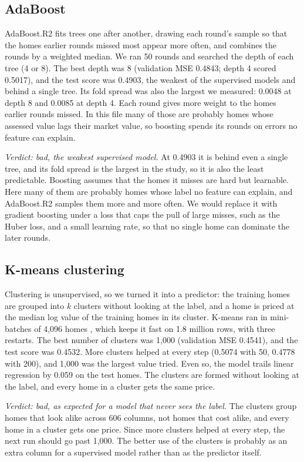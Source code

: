 \documentclass[sigconf,nonacm,10pt]{acmart}
\begin{document}
\subsection{AdaBoost}
AdaBoost.R2 \cite{freund1997,drucker1997} fits trees one after another, drawing each round's sample so that the homes earlier rounds missed most appear more often, and combines the rounds by a weighted median. We ran 50 rounds and searched the depth of each tree (4 or 8). The best depth was 8 (validation MSE 0.4843; depth 4 scored 0.5017), and the test score was 0.4903, the weakest of the supervised models and behind a single tree. Its fold spread was also the largest we measured: 0.0048 at depth 8 and 0.0085 at depth 4. Each round gives more weight to the homes earlier rounds missed. In this file many of those are probably homes whose assessed value lags their market value, so boosting spends its rounds on errors no feature can explain.

\emph{Verdict: bad, the weakest supervised model.} At 0.4903 it is behind even a single tree, and its fold spread is the largest in the study, so it is also the least predictable. Boosting assumes that the homes it misses are hard but learnable. Here many of them are probably homes whose label no feature can explain, and AdaBoost.R2 samples them more and more often. We would replace it with gradient boosting under a loss that caps the pull of large misses, such as the Huber loss, and a small learning rate, so that no single home can dominate the later rounds.

\subsection{K-means clustering}
Clustering is unsupervised, so we turned it into a predictor: the training homes are grouped into $k$ clusters without looking at the label, and a home is priced at the median log value of the training homes in its cluster. K-means \cite{lloyd1982} ran in mini-batches of 4,096 homes \cite{sculley2010}, which keeps it fast on 1.8 million rows, with three restarts. The best number of clusters was 1,000 (validation MSE 0.4541), and the test score was 0.4532. More clusters helped at every step (0.5074 with 50, 0.4778 with 200), and 1,000 was the largest value tried. Even so, the model trails linear regression by 0.059 on the test homes. The clusters are formed without looking at the label, and every home in a cluster gets the same price.

\emph{Verdict: bad, as expected for a model that never sees the label.} The clusters group homes that look alike across 606 columns, not homes that cost alike, and every home in a cluster gets one price. Since more clusters helped at every step, the next run should go past 1,000. The better use of the clusters is probably as an extra column for a supervised model rather than as the predictor itself.
\end{document}
